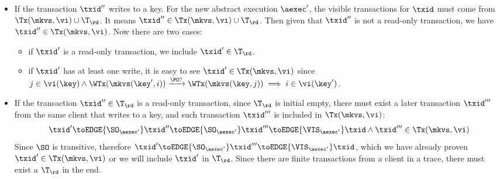 \begin{itemize}
\item If the transaction \( \txid'' \) writes to a key.
For the new abstract execution \( \aexec' \), the visible transactions for \( \txid \) must come from \( \Tx(\mkvs, \vi) \cup \T_\rd \).
It means \( \txid'' \in \Tx(\mkvs, \vi) \cup \T_\rd  \).
Then given that \( \txid'' \) is not a read-only transaction, we have \( \txid'' \in \Tx(\mkvs, \vi) \).
Now there are two cases:
\begin{itemize}
    \item if \( \txid' \) is a read-only transaction, we include \( \txid' \in \T_{\rd} \).
    \item if \( \txid' \) has at least one write, it is easy to see \( \txid' \in \Tx(\mkvs, \vi) \) since \( j \in \vi(\key) \wedge \WTx(\mkvs(\key', i)) \xrightarrow{\PO?} \WTx(\mkvs(\key, j)) \implies i \in \vi(\key') \).
\end{itemize}
\item If the transaction \( \txid'' \in \T_\rd \) is a read-only transaction, 
since \( \T_\rd \) is initial empty, there must exist a later transaction \( \txid''' \) from the same client that writes to a key,
and such transaction \( \txid''' \) is included in \( \Tx(\mkvs, \vi) \):
\[
    \txid' \toEDGE{\SO_{\aexec'}} \txid'' 
    \toEDGE{\SO_{\aexec'}} \txid''' \toEDGE{\VIS_{\aexec'}} \txid 
    \land \txid''' \in \Tx(\mkvs,\vi)
\]
Since \( \SO \) is transitive, 
therefore \( \txid' \toEDGE{\SO_{\aexec'}} \txid''' \toEDGE{\VIS_{\aexec'}} \txid \),
which we have already proven \( \txid' \in \Tx(\mkvs, \vi) \) or we will include \( \txid' \) in \( \T_\rd \).
Since there are finite transactions from a client in a trace, there must exist a \( \T_\rd \) in the end.
\end{itemize}


